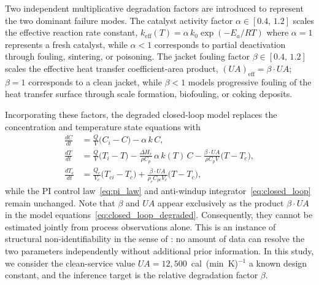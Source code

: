 \documentclass[aps,pre,twocolumn,superscriptaddress,floatfix]{revtex4-2}
\begin{document}

Two independent multiplicative degradation factors are introduced to
represent the two dominant failure modes. The catalyst activity factor $\alpha \in [0.4,\,1.2]$ scales the effective
reaction rate constant, $k_\mathrm{eff}(T) = \alpha\,k_0\exp\!\left(-E_a / RT\right)$ where $\alpha = 1$
represents a fresh catalyst, while $\alpha < 1$ corresponds to partial
deactivation through fouling, sintering, or poisoning. The jacket fouling
factor $\beta \in [0.4,\,1.2]$ scales the effective heat transfer coefficient-area product, $(U\!A)_\mathrm{eff} = \beta\cdot U\!A$; $\beta = 1$
corresponds to a clean jacket, while $\beta < 1$ models progressive fouling of
the heat transfer surface through scale formation, biofouling, or coking deposits.

Incorporating these factors, the degraded closed-loop model replaces the
concentration and temperature state equations with
%
\begin{subequations}
\label{eq:closed_loop_degraded}
\begin{align}
  \frac{dC}{dt}
    &= \frac{Q}{V}\bigl(C_i - C\bigr)
       - \alpha\,k\,C,
  \label{eq:dC_faulted} \\[4pt]
  \frac{dT}{dt}
    &= \frac{Q}{V}\bigl(T_i - T\bigr)
       - \frac{\Delta H_r}{\rho C_p}\,\alpha\,k(T)\,C
       - \frac{\beta\cdot U\!A}{\rho C_p V}\bigl(T - T_c\bigr),
  \label{eq:dT_faulted} \\[4pt]
  \frac{dT_c}{dt}
    &= \frac{Q_c}{V_c}\bigl(T_{ci} - T_c\bigr)
       + \frac{\beta\cdot U\!A}{\rho_c C_{pc} V_c}\bigl(T - T_c\bigr),
  \label{eq:dTc_faulted}
\end{align}
\end{subequations}
%
while the PI control law~\eqref{eq:pi_law} and anti-windup
integrator~\eqref{eq:closed_loop} remain unchanged. 
Note that $\beta$ and $U\!A$ appear exclusively as the
product $\beta \cdot U\!A$ in the model equations~\eqref{eq:closed_loop_degraded}. 
Consequently, they cannot be estimated jointly from process observations alone. 
This is an instance of structural non-identifiability in the sense of 
\citet{Ljung1999}: no amount of data can resolve the two parameters 
independently without additional prior information. In this study, we 
consider the clean-service 
value $U\!A = 12{,}500$~cal~(min~K)$^{-1}$ a known design constant,
and the inference target is the relative degradation factor $\beta$.
\end{document}
